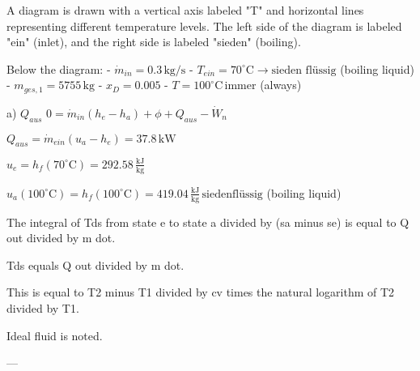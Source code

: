 A diagram is drawn with a vertical axis labeled "T" and horizontal lines representing different temperature levels. The left side of the diagram is labeled "ein" (inlet), and the right side is labeled "sieden" (boiling).  

Below the diagram:  
- \( \dot{m}_{in} = 0.3 \, \text{kg/s} \)  
- \( T_{ein} = 70^\circ \text{C} \rightarrow \text{sieden flüssig} \) (boiling liquid)  
- \( m_{ges,1} = 5755 \, \text{kg} \)  
- \( x_D = 0.005 \)  
- \( T = 100^\circ \text{C} \, \text{immer} \) (always)  

a)  
\( Q_{aus} \)  
\( 0 = \dot{m}_{in} \left( h_e - h_a \right) + \phi + Q_{aus} - \dot{W}_{n} \)  

\( Q_{aus} = \dot{m}_{ein} \left( u_a - h_e \right) = 37.8 \, \text{kW} \)  

\( u_e = h_f(70^\circ \text{C}) = 292.58 \, \frac{\text{kJ}}{\text{kg}} \)  

\( u_a(100^\circ \text{C}) = h_f(100^\circ \text{C}) = 419.04 \, \frac{\text{kJ}}{\text{kg}} \, \text{siedenflüssig} \) (boiling liquid)

The integral of Tds from state e to state a divided by (sa minus se) is equal to Q out divided by m dot.  

Tds equals Q out divided by m dot.  

This is equal to T2 minus T1 divided by cv times the natural logarithm of T2 divided by T1.  

Ideal fluid is noted.  

---